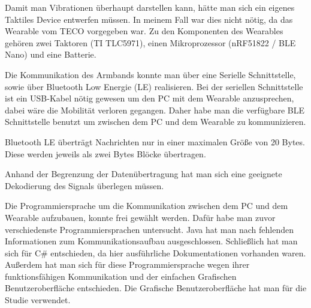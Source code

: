 Damit man Vibrationen {\"u}berhaupt darstellen kann, h{\"a}tte man sich ein eigenes Taktiles Device entwerfen m{\"u}ssen. In meinem Fall war dies nicht n{\"o}tig, da das Wearable vom TECO vorgegeben war. Zu den Komponenten des Wearables gehören zwei Taktoren (TI TLC5971), einen Mikroprozessor (nRF51822 / BLE Nano) und eine Batterie.

Die Kommunikation des Armbands konnte man {\"u}ber eine Serielle Schnittstelle, sowie {\"u}ber Bluetooth Low Energie (LE) realisieren.
Bei der seriellen Schnittstelle ist ein USB-Kabel n{\"o}tig gewesen um den PC mit dem Wearable anzusprechen, dabei w{\"a}re die Mobilit{\"a}t verloren gegangen. Daher habe man die verf{\"u}gbare BLE Schnittstelle benutzt um zwischen dem PC und dem Wearable zu kommunizieren. 

Bluetooth LE {\"u}bertr{\"a}gt Nachrichten nur in einer maximalen Gr{\"o}{\ss}e von 20 Bytes. Diese werden jeweils als zwei Bytes Bl{\"o}cke {\"u}bertragen. 

Anhand der Begrenzung der Daten{\"u}bertragung hat man sich eine geeignete Dekodierung des Signals {\"u}berlegen m{\"u}ssen. 

Die Programmiersprache um die Kommunikation zwischen dem PC und dem Wearable aufzubauen, konnte frei gew{\"a}hlt werden. 
Dafür habe man zuvor verschiedenste Programmiersprachen untersucht. 
Java hat man nach fehlenden Informationen zum Kommunikationsaufbau ausgeschlossen.
Schlie{\ss}lich hat man sich f{\"u}r C\# entschieden, da hier ausf{\"u}hrliche Dokumentationen vorhanden waren.
Außerdem hat man sich für diese Programmiersprache wegen ihrer funktionsfähigen Kommunikation und der einfachen Grafischen Benutzeroberfl{\"a}che entschieden. 
Die Grafische Benutzeroberfl{\"a}che hat man für die Studie verwendet.

